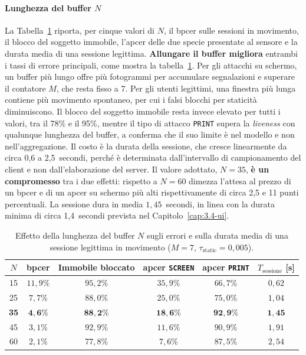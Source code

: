 \paragraph{Lunghezza del buffer $N$}
La Tabella~\ref{tab:lunghezzaBuffer} riporta, per cinque valori di $N$, il \gls{bpcer} sulle sessioni in movimento, il blocco del soggetto immobile, l'\gls{apcer} delle due specie presentate al sensore e la durata media di una sessione legittima.
\textbf{Allungare il buffer migliora} entrambi i tassi di errore principali, come mostra la tabella~\ref{tab:lunghezzaBuffer}.
Per gli attacchi su schermo, un buffer più lungo offre più fotogrammi per accumulare segnalazioni e superare il contatore $M$, che resta fisso a 7.
Per gli utenti legittimi, una finestra più lunga contiene più movimento spontaneo, per cui i falsi blocchi per staticità diminuiscono.
Il blocco del soggetto immobile resta invece elevato per tutti i valori, tra il 78\% e il 95\%, mentre il tipo di attacco \texttt{PRINT} supera la \textit{liveness} con qualunque lunghezza del buffer, a conferma che il suo limite è nel modello e non nell'aggregazione.
Il costo è la durata della sessione, che cresce linearmente da circa 0,6 a 2,5~secondi, perché è determinata dall'intervallo di campionamento del client e non dall'elaborazione del server.
Il valore adottato, $N = 35$, \textbf{è un compromesso} tra i due effetti: rispetto a $N = 60$ dimezza l'attesa al prezzo di un \gls{bpcer} e di un \gls{apcer} su schermo più alti rispettivamente di circa 2,5 e 11 punti percentuali.
La sessione dura in media $1{,}45$~secondi, in linea con la durata minima di circa 1,4~secondi prevista nel Capitolo~\ref{cap:3.4-ui}.
\begin{table}[htbp]
    \centering
    \footnotesize
    \renewcommand{\arraystretch}{1.25}
    \begin{tabular*}{\textwidth}{@{\extracolsep{\fill}}cccccc@{}}
        \hline
        \textbf{$N$} & \textbf{\gls{bpcer}} & \textbf{Immobile bloccato} & \textbf{\gls{apcer} \texttt{SCREEN}} & \textbf{\gls{apcer} \texttt{PRINT}} & \textbf{$T_{\text{sessione}}$ [s]} \\
        \hline
        15 & $11{,}9\%$ & $95{,}2\%$ & $35{,}9\%$ & $66{,}7\%$ & $0{,}62$ \\
        25 & $7{,}7\%$ & $88{,}0\%$ & $25{,}0\%$ & $75{,}0\%$ & $1{,}04$ \\
        \textbf{35} & $\mathbf{4{,}6\%}$ & $\mathbf{88{,}2\%}$ & $\mathbf{18{,}6\%}$ & $\mathbf{92{,}9\%}$ & $\mathbf{1{,}45}$ \\
        45 & $3{,}1\%$ & $92{,}9\%$ & $11{,}6\%$ & $90{,}9\%$ & $1{,}91$ \\
        60 & $2{,}1\%$ & $77{,}8\%$ & $7{,}6\%$ & $87{,}5\%$ & $2{,}54$ \\
        \hline
    \end{tabular*}
    \caption[Effetto della lunghezza del buffer sugli errori]{Effetto della lunghezza del buffer $N$ sugli errori e sulla durata media di una sessione legittima in movimento ($M = 7$, $\tau_{\text{static}} = 0{,}005$).}
    \label{tab:lunghezzaBuffer}
\end{table}

